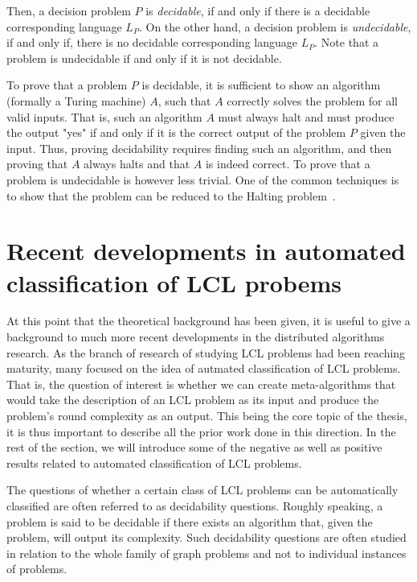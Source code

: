 Then, a decision problem $P$ is \emph{decidable}, if and only if
there is a decidable corresponding language $L_P$.
On the other hand, a decision problem is \emph{undecidable},
if and only if, there is no decidable corresponding language $L_P$.
Note that a problem is undecidable if and only if it is not
decidable.

To prove that a problem $P$ is decidable, it is sufficient to
show an algorithm (formally a Turing machine) $A$, such that
$A$ correctly solves the problem for all valid inputs. That is,
such an algorithm $A$ must always halt and must produce the
output "yes" if and only if it is the correct output of the
problem $P$ given the input. Thus, proving decidability
requires finding such an algorithm, and then proving
that $A$ always halts and that $A$ is indeed correct.
To prove that a problem is undecidable is however less
trivial. One of the common techniques is to show that
the problem can be reduced to the Halting problem~\cite{Margenstern2000, Turing1937}. 

\section{Recent developments in automated classification of LCL probems}

At this point that the theoretical background has been given, it is
useful to give a background to much more recent developments in the
distributed algorithms research. As the branch of research of
studying LCL problems had been reaching maturity, many focused
on the idea of autmated classification of LCL problems. That is,
the question of interest is whether we can create meta-algorithms
that would take the description of an LCL problem as its input
and produce the problem's round complexity as an output.
This being the core topic of the thesis, it is thus important
to describe all the prior work done in this direction.
In the rest of the
section, we will introduce some of the negative as well as positive results
related to automated classification of LCL problems.

The questions of whether a certain class of LCL problems
can be automatically classified are often referred to
as decidability questions. Roughly speaking, a problem is
said to be decidable if there exists an algorithm that,
given the problem, will output its complexity. Such decidability
questions are often studied in relation to the whole
family of graph problems and not to individual instances
of problems.

